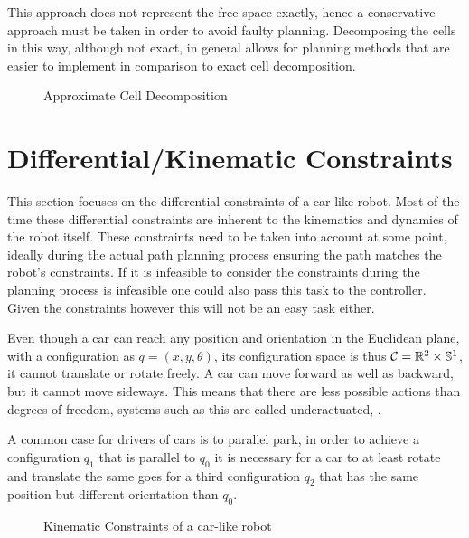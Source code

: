 This approach does not represent the free space exactly, hence a conservative approach must be taken in order to avoid faulty planning. Decomposing the cells in this way, although not exact, in general allows for planning methods that are easier to implement in comparison to exact cell decomposition. \cite{Latombe.1991}

\begin{figure}[h]
    \caption{Approximate Cell Decomposition}
    \label{fig:cellDecomposition}
\end{figure}

\section{Differential/Kinematic Constraints}\label{sec:differentialConstraints}
This section focuses on the differential constraints of a car-like robot. Most of the time these differential constraints are inherent to the kinematics and dynamics of the robot itself. These constraints need to be taken into account at some point, ideally during the actual path planning process ensuring the path matches the robot's constraints. If it is infeasible to consider the constraints during the planning process is infeasible one could also pass this task to the controller. Given the constraints however this will not be an easy task either. \cite{LaValle.2006}

Even though a car can reach any position and orientation in the Euclidean plane, with a configuration as $q = (x,y,\theta)$, its configuration space is thus $\mathcal{C} = \mathbb{R}^2 \times \mathbb{S}^1$, it cannot translate or rotate freely. A car can move forward as well as backward, but it cannot move sideways. This means that there are less possible actions than degrees of freedom, systems such as this are called underactuated, \cite{LaValle.2006}.

A common case for drivers of cars is to parallel park, in order to achieve a configuration $q_1$ that is parallel to $q_0$ it is necessary for a car to at least rotate and translate the same goes for a third configuration $q_2$ that has the same position but different orientation than $q_0$. \cite{Latombe.1991}

\begin{figure}[h]
    \caption{Kinematic Constraints of a car-like robot}
    \label{fig:kinematicConstraints}
\end{figure}

